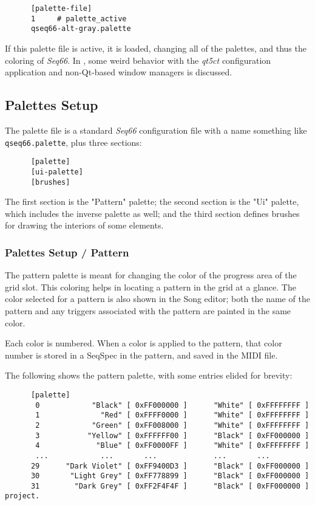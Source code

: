    \begin{verbatim}
      [palette-file]
      1     # palette_active
      qseq66-alt-gray.palette
   \end{verbatim}

   If this palette file is active, it is loaded, changing all of the palettes,
   and thus the coloring of \textsl{Seq66}.
   In , some weird behavior with
   the \textsl{qt5ct} configuration application and non-Qt-based window managers
   is discussed.

\subsection{Palettes Setup}
\label{subsec:palettes_setup}

   The palette file is a standard \textsl{Seq66} configuration file with a name
   something like \texttt{qseq66.palette}, plus three sections:

   \begin{verbatim}
      [palette]
      [ui-palette]
      [brushes]
   \end{verbatim}

   The first section is the "Pattern" palette; the second section is the
   "Ui" palette, which includes the inverse palette as well; and the third
   section defines brushes for drawing the interiors of some elements.

\subsubsection{Palettes Setup / Pattern}
\label{subsubsec:palettes_setup_pattern}

   The pattern palette is meant for changing the color of the progress
   area of the grid slot.
   This coloring helps in locating a pattern in the grid at a glance.
   The color selected for a pattern is also shown in the Song editor;
   both the name of the pattern and any triggers associated with the pattern
   are painted in the same color.

   Each color is numbered. When a color is applied to the pattern,
   that color number is stored in a SeqSpec in the pattern, and saved
   in the MIDI file.

   The following shows the pattern palette, with some entries elided for
   brevity:

   \begin{verbatim}
      [palette]
       0            "Black" [ 0xFF000000 ]      "White" [ 0xFFFFFFFF ]
       1              "Red" [ 0xFFFF0000 ]      "White" [ 0xFFFFFFFF ]
       2            "Green" [ 0xFF008000 ]      "White" [ 0xFFFFFFFF ]
       3           "Yellow" [ 0xFFFFFF00 ]      "Black" [ 0xFF000000 ]
       4             "Blue" [ 0xFF0000FF ]      "White" [ 0xFFFFFFFF ]
       ...            ...       ...             ...       ...
      29      "Dark Violet" [ 0xFF9400D3 ]      "Black" [ 0xFF000000 ]
      30       "Light Grey" [ 0xFF778899 ]      "Black" [ 0xFF000000 ]
      31        "Dark Grey" [ 0xFF2F4F4F ]      "Black" [ 0xFF000000 ]
project.
   \end{verbatim}

